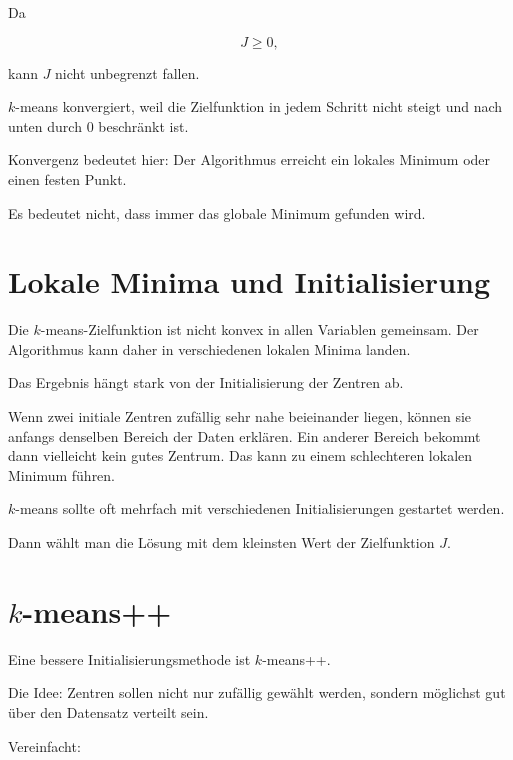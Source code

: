 Da

\[
    J \geq 0,
\]

kann \(J\) nicht unbegrenzt fallen.

\begin{conceptbox}
\(k\)-means konvergiert, weil die Zielfunktion in jedem Schritt nicht steigt und nach unten durch \(0\) beschränkt ist.
\end{conceptbox}

\begin{notebox}
Konvergenz bedeutet hier:
Der Algorithmus erreicht ein lokales Minimum oder einen festen Punkt.

Es bedeutet nicht, dass immer das globale Minimum gefunden wird.
\end{notebox}

\section{Lokale Minima und Initialisierung}

Die \(k\)-means-Zielfunktion ist nicht konvex in allen Variablen gemeinsam.
Der Algorithmus kann daher in verschiedenen lokalen Minima landen.

Das Ergebnis hängt stark von der Initialisierung der Zentren ab.

\begin{examplebox}
Wenn zwei initiale Zentren zufällig sehr nahe beieinander liegen, können sie anfangs denselben Bereich der Daten erklären.
Ein anderer Bereich bekommt dann vielleicht kein gutes Zentrum.
Das kann zu einem schlechteren lokalen Minimum führen.
\end{examplebox}

\begin{conceptbox}
\(k\)-means sollte oft mehrfach mit verschiedenen Initialisierungen gestartet werden.

Dann wählt man die Lösung mit dem kleinsten Wert der Zielfunktion \(J\).
\end{conceptbox}

\section{\(k\)-means++}

Eine bessere Initialisierungsmethode ist \(k\)-means++.

Die Idee:
Zentren sollen nicht nur zufällig gewählt werden, sondern möglichst gut über den Datensatz verteilt sein.

Vereinfacht:

